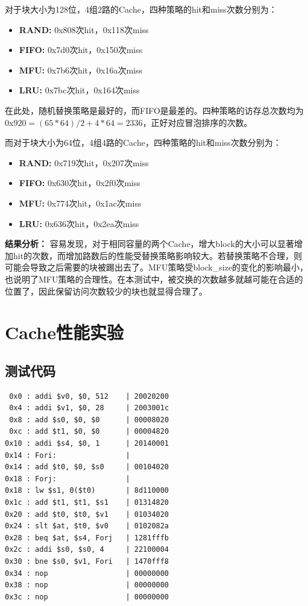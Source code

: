 \documentclass[12pt]{article} %
\begin{document}
\begin{sloppypar}
对于块大小为128位，4组2路的Cache，四种策略的hit和miss次数分别为：
\begin{itemize}
\item {\bf RAND:} 0x808次hit，0x118次miss
\item {\bf FIFO:} 0x7d0次hit，0x150次miss
\item {\bf MFU:} 0x7b6次hit，0x16a次miss
\item {\bf LRU:} 0x7bc次hit，0x164次miss
\end{itemize}

在此处，随机替换策略是最好的，而FIFO是最差的。四种策略的访存总次数均为$0\text{x}920=(65*64)/2+4*64=2336$，正好对应冒泡排序的次数。

而对于块大小为64位，4组4路的Cache，四种策略的hit和miss次数分别为：
\begin{itemize}
\item {\bf RAND:} 0x719次hit，0x207次miss
\item {\bf FIFO:} 0x630次hit，0x2f0次miss
\item {\bf MFU:} 0x774次hit，0x1ac次miss
\item {\bf LRU:} 0x636次hit，0x2ea次miss
\end{itemize}

{\bf 结果分析：} 容易发现，对于相同容量的两个Cache，增大block的大小可以显著增加hit的次数，而增加路数后的性能受替换策略影响较大。若替换策略不合理，则可能会导致之后需要的块被踢出去了。MFU策略受block\_size的变化的影响最小，也说明了MFU策略的合理性。在本测试中，被交换的次数越多就越可能在合适的位置了，因此保留访问次数较少的块也就显得合理了。





\newpage
\section{Cache性能实验}

\subsection{测试代码}

\begin{lstlisting}
 0x0 : addi $v0, $0, 512    | 20020200
 0x4 : addi $v1, $0, 28     | 2003001c
 0x8 : add $s0, $0, $0      | 00008020
 0xc : add $t1, $0, $0      | 00004820
0x10 : addi $s4, $0, 1      | 20140001
0x14 : Fori:                | 
0x14 : add $t0, $0, $s0     | 00104020
0x18 : Forj:                | 
0x18 : lw $s1, 0($t0)       | 8d110000
0x1c : add $t1, $t1, $s1    | 01314820
0x20 : add $t0, $t0, $v1    | 01034020
0x24 : slt $at, $t0, $v0    | 0102082a
0x28 : beq $at, $s4, Forj   | 1281fffb
0x2c : addi $s0, $s0, 4     | 22100004
0x30 : bne $s0, $v1, Fori   | 1470fff8
0x34 : nop                  | 00000000
0x38 : nop                  | 00000000
0x3c : nop                  | 00000000
\end{lstlisting}


\end{sloppypar}
\end{document}
